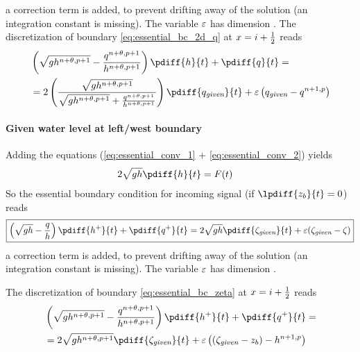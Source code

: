 a correction term is added, to prevent drifting away of the solution (an integration constant is missing).
The variable $\varepsilon$ has dimension \bunit{\per\second}.
The discretization of  boundary \autoref{eq:essential_bc_2d_q} at $x=i+\frac{1}{2}$ reads
\begin{align}
    &\left(\sqrt{gh^{n+\theta,p+1}} - \frac{q^{n+\theta,p+1}}{h^{n+\theta,p+1}} \right) \pdiff{h}{t} + \pdiff{q}{t} =
    \nonumber \\*
    & = 2 \left(  \frac{\sqrt{gh^{n+\theta,p+1}}}{\sqrt{gh^{n+\theta,p+1}} + \frac{q^{n+\theta,p+1}}{h^{n+\theta,p+1}}} \right) \pdiff{q_{\textit{given}}}{t} + \eps \left( q_{\textit{given}} - q^{n+1,p}   \right)
\end{align}



%
\paragraph*{Given water level at left/west boundary}


Adding the equations (\eqref{eq:essential_conv_1} $+$ \eqref{eq:essential_conv_2}) yields
\begin{align}
    2 \sqrt{gh} \pdiff{h}{t} & = F(t)
\end{align}
%
So the essential boundary condition for incoming signal (if $\lpdiff{z_b}{t} = 0$) reads
\begin{align}
    {\boxed{
            \left(\sqrt{gh} - \frac{q}{h}\right) \pdiff{h^{+}}{t} + \pdiff{q^{+}}{t}  = 2 \sqrt{gh} \pdiff{\zeta_{\textit{given}}}{t}  + \eps(\zeta_{\textit{given}} - \zeta)
    }}\label{eq:essential_bc_zeta}
\end{align}
a correction term is added, to prevent drifting away of the solution (an integration constant is missing).
The variable $\varepsilon$ has dimension \bunit{\metre\per\square\second}.

The discretization of  boundary \autoref{eq:essential_bc_zeta} at $x=i+\frac{1}{2}$ reads
\begin{align}
    &\left(\sqrt{gh^{n+\theta,p+1}} - \frac{q^{n+\theta,p+1}}{h^{n+\theta,p+1}}\right) \pdiff{h^{+}}{t} + \pdiff{q^{+}}{t}  =
    \nonumber \\*
    & = 2 \sqrt{gh^{n+\theta,p+1}} \pdiff{\zeta_{\textit{given}}}{t}
    + \eps \left( (\zeta_{\textit{given}} -z_b) - h^{n+1,p}   \right)
\end{align}

